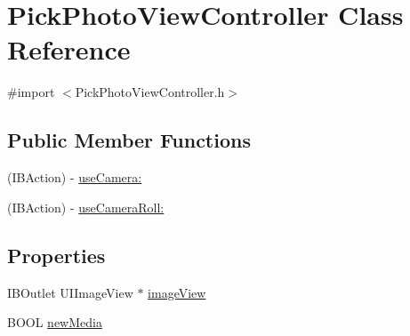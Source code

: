 \hypertarget{interface_pick_photo_view_controller}{\section{\-Pick\-Photo\-View\-Controller \-Class \-Reference}
\label{interface_pick_photo_view_controller}
}


{\ttfamily \#import $<$\-Pick\-Photo\-View\-Controller.\-h$>$}

\subsection*{\-Public \-Member \-Functions}
\begin{DoxyCompactItemize}
\item 
(\-I\-B\-Action) -\/ \hyperlink{interface_pick_photo_view_controller_acf750fda9d7d61744e80864571167be2}{use\-Camera\-:}
\item 
(\-I\-B\-Action) -\/ \hyperlink{interface_pick_photo_view_controller_a9a153c1e0085cd8869fed512304b7783}{use\-Camera\-Roll\-:}
\end{DoxyCompactItemize}
\subsection*{\-Properties}
\begin{DoxyCompactItemize}
\item 
\-I\-B\-Outlet \-U\-I\-Image\-View $\ast$ \hyperlink{interface_pick_photo_view_controller_a8c4523596388c339de4b0bde905c97b2}{image\-View}
\item 
\-B\-O\-O\-L \hyperlink{interface_pick_photo_view_controller_a4bca79b4b22834aa3cf000b9a4213517}{new\-Media}
\end{DoxyCompactItemize}


